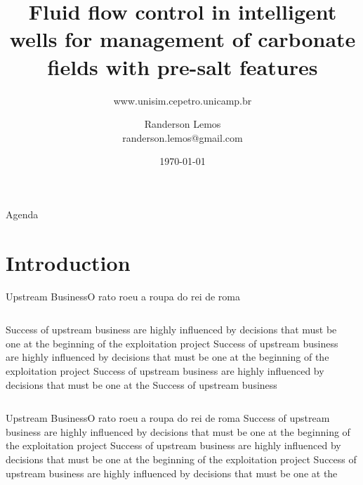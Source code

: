 \documentclass[aspectratio=169]{beamer}
\title{Fluid flow control in intelligent wells for management of carbonate fields with pre-salt features}
\author{Randerson Lemos\\[-5pt]{\scriptsize randerson.lemos@gmail.com}}
\subtitle{www.unisim.cepetro.unicamp.br}
\date{\today}
\begin{document}
{%
%
\begin{frame}[plain]%
\titlepage%
\end{frame}%
}

\begin{frame}[plain]{Agenda}
\tableofcontents
\end{frame}

\section{Introduction}
\begin{frame}[c]{Upstream Business}{O rato roeu a roupa do rei de roma}\nointerlineskip
\begin{columns}[onlytextwidth]%
	\justifying%
		Success of upstream business are highly influenced by decisions that must be one at the beginning of the exploitation project Success of upstream business are highly influenced by decisions that must be one at the beginning of the exploitation project Success of upstream business are highly influenced by decisions that must be one at the Success of upstream business%
	\justifying%
	\rule{\textwidth}{150pt}%
\end{columns}%
\end{frame}%


\begin{frame}[t]{Upstream Business}{O rato roeu a roupa do rei de roma}\nointerlineskip\justifying%
Success of upstream business are highly influenced by decisions that must be one at the beginning of the exploitation project Success of upstream business are highly influenced by decisions that must be one at the beginning of the exploitation project Success of upstream business are highly influenced by decisions that must be one at the 
\end{frame}
\end{document}
